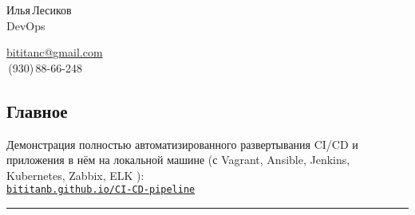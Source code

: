 \documentclass[11pt, a4paper]{article}
\newcommand{\Delimitline}{
  {\rule{\linewidth}{0.13ex}}
}
\newcommand\rurl[1]{%
  \href{http://#1}{\nolinkurl{#1}}%
}
\newcommand\Eng[1]{%
  \foreignlanguage{english}{#1}%
}
\begin{document}
\sffamily

\pagecolor[RGB]{245,245,245}

{\setlength\multicolsep{0pt}%
\begin{multicols}{2}

\begin{spacing}{1.5}
  {\LARGE Илья\,Лесиков}\\
  {\Large\Eng{DevOps}}\hspace{1.3cm}{\large 25\,лет}
\end{spacing}

\columnbreak

\begin{flushright}
  \begin{spacing}{1.3}
    {\large\href{mailto:bititanc@gmail.com}{\Eng{bititanc@gmail.com}}}\\
    {\fontsize{1.4em}{0}\,(930)\,88-66-248} \normalsize\\
  \end{spacing}
\end{flushright}

\end{multicols}
}


\vspace{3ex}

\begin{comment}
У меня нет образования (неоконченный колледж электроники) и сомнительный стаж (10 месяцев сисадмином).\\
Но, самообучаясь, за последние пару лет я получил достаточный опыт и в общей автоматизации, и в \Eng{CI/CD}.\\
Получил некоторый опыт и в кодинге, как и хороший общий технический бэкграунд (\Eng{Linux}, сети и т.\,п.).
\end{comment}


\subsection*{Главное}
Демонстрация полностью автоматизированного развертывания \Eng{CI/CD} и приложения в нём на локальной машине 
(с \Eng{Vagrant, Ansible, Jenkins, Kubernetes, Zabbix, ELK}):\\
\rurl{bititanb.github.io/CI-CD-pipeline}\\
\Delimitline
\end{document}
